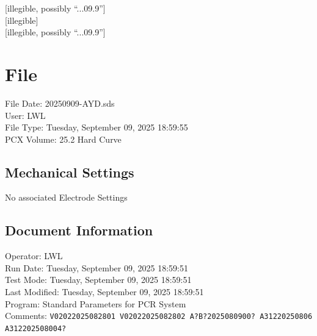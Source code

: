 \documentclass[UTF8,10pt,a4paper,fontset=fandol]{ctexart}
\newcommand{\fieldvalue}[1]{#1}
\newcommand{\handwritten}[1]{#1}
\begin{document}
\newpage

\hfill\handwritten{[illegible, possibly ``...09.9'']}\\
\hfill\handwritten{[illegible]}\\
\hfill\handwritten{[illegible, possibly ``...09.9'']}

\section{File}

\noindent
File Date: \fieldvalue{20250909-AYD.sds}\\
User: \fieldvalue{LWL}\\
File Type: \fieldvalue{Tuesday, September 09, 2025 18:59:55}\\
PCX Volume: \fieldvalue{25.2 Hard Curve}

\subsection{Mechanical Settings}

No associated Electrode Settings

\subsection{Document Information}

\noindent
Operator: \fieldvalue{LWL}\\
Run Date: \fieldvalue{Tuesday, September 09, 2025 18:59:51}\\
Test Mode: \fieldvalue{Tuesday, September 09, 2025 18:59:51}\\
Last Modified: \fieldvalue{Tuesday, September 09, 2025 18:59:51}\\
Program: \fieldvalue{Standard Parameters for PCR System}\\
Comments: \fieldvalue{\texttt{V02022025082801 V02022025082802 A?B?2025080900? A31220250806 A312202508004?}}
\end{document}
